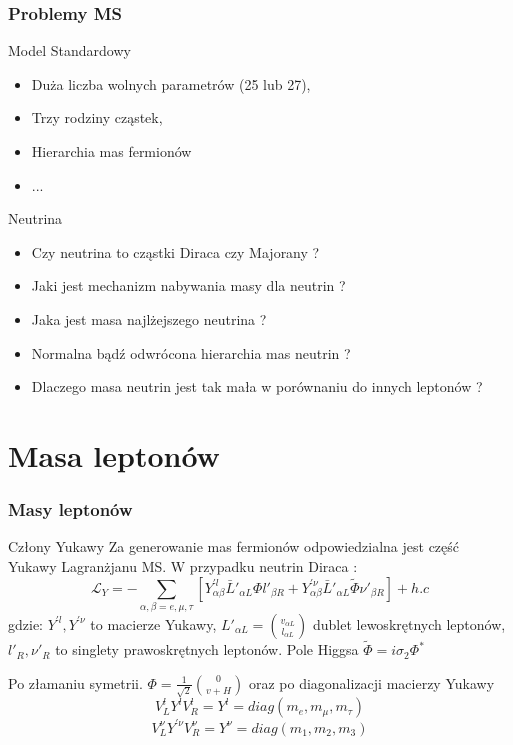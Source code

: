 \documentclass[11pt]{beamer}
\begin{document}
\begin{frame}
\frametitle{Problemy MS}
\begin{block}{Model Standardowy}
\begin{itemize}
\item Duża liczba wolnych parametrów (25 lub 27),
\item Trzy rodziny cząstek,
\item Hierarchia mas fermionów
\item ...
\end{itemize}
\end{block}
\begin{block}{Neutrina}
\begin{itemize}
\item Czy neutrina to cząstki Diraca czy Majorany ? 
\item Jaki jest mechanizm nabywania masy dla neutrin ? 
\item Jaka jest masa najlżejszego neutrina ?
\item Normalna bądź odwrócona hierarchia mas neutrin ?
\item Dlaczego masa neutrin jest tak mała w porównaniu do innych leptonów ?
\end{itemize}
\end{block}
\end{frame}
\section{Masa leptonów}
\begin{frame}
\frametitle{Masy leptonów}
\begin{block}{Człony Yukawy}
Za generowanie mas fermionów odpowiedzialna jest część Yukawy Lagranżjanu MS. W przypadku neutrin Diraca :
$$\mathcal{L}_Y=-\sum_{\alpha,\beta=e,\mu,\tau}\left[ Y^{'l}_{\alpha\beta}\bar{L}'_{\alpha L} \Phi l'_{\beta R} + Y^{'\nu}_{\alpha\beta} \bar{L}'_{\alpha L} \tilde{\Phi}\nu'_{\beta R}\right] + h.c$$
gdzie: $Y^{'l},Y^{'\nu}$ to macierze Yukawy, $L'_{\alpha L}= {v_{\alpha L} \choose l_{\alpha L}}$ dublet lewoskrętnych leptonów, $l'_R,\nu'_R$ to singlety prawoskrętnych leptonów. Pole Higgsa $\tilde{\Phi}=i\sigma_2\Phi^{\ast}$
\end{block}
Po złamaniu symetrii.  $\Phi = \frac{1}{\sqrt{2}}{0 \choose v+H}$ oraz po diagonalizacji macierzy Yukawy $$V_L^l Y^l V_R^l = Y^l = diag(m_e,m_{\mu},m_{\tau}) $$
$$V_L^{\nu}Y^{'\nu}V_R^\nu = Y^{\nu} = diag(m_1,m_{2},m_{3}) $$
\end{frame}
\end{document}

